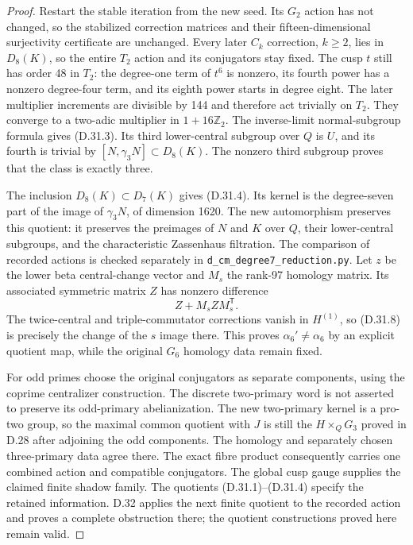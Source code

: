 \begin{proof}
Restart the stable iteration from the new seed.
Its $G_2$ action has not changed, so the stabilized
correction matrices and their fifteen-dimensional
surjectivity certificate are unchanged. Every later
$C_k$ correction, $k\geq2$, lies in $D_8(K)$, so the
entire $T_2$ action and its conjugators stay fixed.
The cusp $t$ still has order 48 in $T_2$: the
degree-one term of $t^6$ is nonzero, its fourth
power has a nonzero degree-four term, and its eighth
power starts in degree eight. The later multiplier
increments are divisible by 144 and therefore act
trivially on $T_2$. They converge to a two-adic
multiplier in $1+16\mathbb Z_2$.
The inverse-limit normal-subgroup formula gives
(D.31.3). Its third lower-central subgroup over $Q$
is $U$, and its fourth is trivial by
$[N,\gamma_3N]\subset D_8(K)$. The nonzero third
subgroup proves that the class is exactly three.

The inclusion $D_8(K)\subset D_7(K)$ gives (D.31.4).
Its kernel is the degree-seven part of the image of
$\gamma_3N$, of dimension 1620. The new automorphism
preserves this quotient: it preserves the preimages
of $N$ and $K$ over $Q$, their lower-central subgroups,
and the characteristic Zassenhaus filtration. The
comparison of recorded actions is checked separately
in \texttt{d\_cm\_degree7\_reduction.py}. Let $z$ be
the lower beta central-change vector and $M_s$ the
rank-97 homology matrix. Its associated symmetric
matrix $Z$ has nonzero difference
\[
                       Z+M_sZM_s^{\mathsf T}.          \tag{D.31.8}
\]
The twice-central and triple-commutator corrections
vanish in $H^{(1)}$, so (D.31.8) is precisely the
change of the $s$ image there. This proves
$\alpha_6'\ne\alpha_6$ by an explicit quotient map,
while the original $G_6$ homology data remain fixed.

For odd primes choose the original conjugators as
separate components, using the coprime centralizer
construction. The discrete two-primary word is not
asserted to preserve its odd-primary abelianization.
The new two-primary kernel is a pro-two group, so
the maximal common quotient with $J$ is still the
$H\times_QG_3$ proved in D.28 after adjoining the
odd components. The homology and separately chosen
three-primary data agree there. The exact fibre
product consequently carries one combined action
and compatible conjugators. The global cusp gauge
supplies the claimed finite shadow family. The
quotients (D.31.1)--(D.31.4) specify the retained
information. D.32 applies the next finite quotient
to the recorded action and proves a complete
obstruction there; the quotient constructions
proved here remain valid.
\end{proof}
